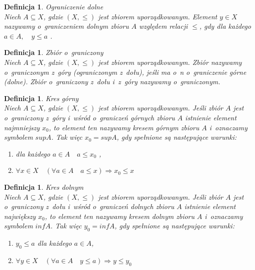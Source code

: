 \documentclass[12pt,a4paper]{report}
\newtheorem{definition}[theorem]{Definicja}
\begin{document}
\begin{definition}{Ograniczenie dolne \cite[Rozdział 2]{blaszczyk2007}}\\
Niech $A \subseteq X$, gdzie $(X, \leq)$ jest zbiorem uporządkowanym. Element $y \in X$ nazywamy o~graniczeniem dolnym zbioru $A$ względem relacji $\leq$, gdy dla każdego $a \in A, \quad y \leq a$ . 
\end{definition}


\begin{definition}{Zbiór o~graniczony \cite[Rozdział 2]{blaszczyk2007}}\\
Niech $A \subseteq X$, gdzie $(X, \leq)$ jest zbiorem uporządkowanym. Zbiór nazywamy o~graniczonym z~góry (ograniczonym z~dołu), jeśli ma o~n o~graniczenie górne (dolne). Zbiór o~graniczony z~dołu i~z~góry nazywamy o~graniczonym. 
\end{definition}


\begin{definition}{Kres górny \cite[Rozdział 2]{blaszczyk2007}}\\
Niech $A \subseteq X$, gdzie $(X, \leq)$ jest zbiorem uporządkowanym. Jeśli zbiór $A$ jest o~graniczony z~góry i~wśród o~graniczeń górnych zbioru $A$ istnienie element najmniejszy $x_0$, to element ten nazywamy kresem górnym zbioru $A$ i~oznaczamy symbolem $sup A$. Tak więc $x_0 =sup A$, gdy spełnione są następujące warunki:
\begin{enumerate}
\item dla każdego $a \in A \quad a \leq x_0$ ,
\item $\forall x \in X \quad ( \forall a\in A  \quad a\leq x)  \Rightarrow x_0 \leq x$
\end{enumerate}
\end{definition}


\begin{definition}{Kres dolnym \cite[Rozdział 2]{blaszczyk2007}}\\
Niech $A \subseteq X$, gdzie $(X, \leq)$ jest zbiorem uporządkowanym. Jeśli zbiór $A$ jest o~graniczony z~dołu i~wśród o~graniczeń dolnych zbioru $A$ istnienie element największy $x_0$, to element ten nazywamy kresem dolnym zbioru $A$ i~oznaczamy symbolem $inf A$. Tak więc $y_0 =inf A$, gdy spełnione są następujące warunki:
\begin{enumerate}
\item $y_0 \leq a$ dla każdego $a \in A$,
\item $\forall y \in X \quad ( \forall a\in A  \quad y\leq a)  \Rightarrow y \leq y_0$
\end{enumerate}
\end{definition}
\end{document}
